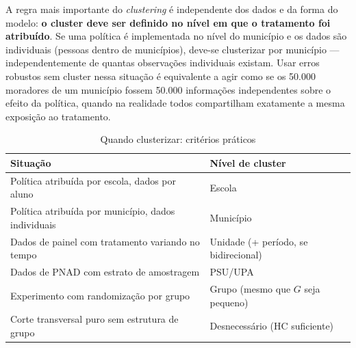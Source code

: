 A regra mais importante do \textit{clustering} é independente dos dados e da forma do modelo: \textbf{o cluster deve ser definido no nível em que o tratamento foi atribuído}. Se uma política é implementada no nível do município e os dados são individuais (pessoas dentro de municípios), deve-se clusterizar por município — independentemente de quantas observações individuais existam. Usar erros robustos sem cluster nessa situação é equivalente a agir como se os 50.000 moradores de um município fossem 50.000 informações independentes sobre o efeito da política, quando na realidade todos compartilham exatamente a mesma exposição ao tratamento.

\begin{table}[H]
\centering
\caption{Quando clusterizar: critérios práticos}
\label{tab:quando_clusterizar}
\begin{tabular}{p{6.2cm} p{6.0cm}}
\toprule
\textbf{Situação} & \textbf{Nível de cluster} \\
\midrule
Política atribuída por escola, dados por aluno    & Escola \\
Política atribuída por município, dados individuais & Município \\
Dados de painel com tratamento variando no tempo  & Unidade (+ período, se bidirecional) \\
Dados de PNAD com estrato de amostragem           & PSU/UPA \\
Experimento com randomização por grupo            & Grupo (mesmo que $G$ seja pequeno) \\
Corte transversal puro sem estrutura de grupo     & Desnecessário (HC suficiente) \\
\bottomrule
\end{tabular}

\vspace{4pt}
\end{table}

